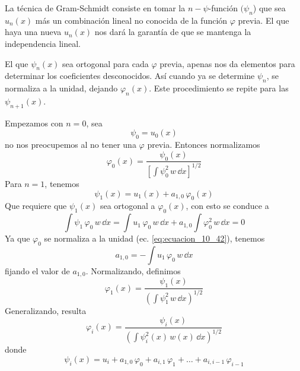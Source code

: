 La técnica de Gram-Schmidt consiste en tomar la $n-\psi$-función $(\psi_{n}$) que sea $u_{n}(x)$ más un combinación lineal no conocida de la función $\varphi$ previa. El que haya una nueva $u_{n}(x)$ nos dará la garantía de que se mantenga la independencia lineal.

El que $\psi_{n}(x)$ sea ortogonal para cada $\varphi$ previa, apenas nos da elementos para determinar los coeficientes desconocidos. Así cuando ya se determine $\psi_{n}$, se normaliza a la unidad, dejando $\varphi_{n}(x)$. Este procedimiento se repite para las $\psi_{n+1}(x)$.

Empezamos con $n=0$, sea
\begin{equation}
\psi_{0} = u_{0}(x)
\label{eq:ecuacion_10_41}
\end{equation}
no nos preocupemos al no tener una $\varphi$ previa. Entonces normalizamos
\begin{equation}
\varphi_{0}(x) = \dfrac{\psi_{0}(x)}{\left[ \int \psi_{0}^{2} \, w \, \dd x \right]^{1/2}}
\label{eq:ecuacion_10_42}
\end{equation}
Para $n=1$, tenemos
\begin{equation}
\psi_{1}(x) = u_{1}(x) + a_{1,0} \, \varphi_{0}(x)
\label{eq:ecuacion_10_43}
\end{equation}
Que requiere que $\psi_{1}(x)$ sea ortogonal a $\varphi_{0}(x)$, con esto se conduce a
\begin{equation}
\int \psi_{1} \, \varphi_{0} \, w \, \dd x = \int u_{1} \, \varphi_{0} \, w \, \dd x + a_{1,0} \int \varphi_{0}^{2} \, w \,  \dd x = 0
\label{eq:ecuacion_10_44}
\end{equation}
Ya que $\varphi_{0}$ se normaliza a la unidad (ec. \ref{eq:ecuacion_10_42}), tenemos
\begin{equation}
a_{1,0} = - \int	u_{1} \, \varphi_{0} \, w \, \dd x
\label{eq:ecuacion_10_45}
\end{equation}
fijando el valor de $a_{1, 0}$. Normalizando, definimos
\begin{equation}
\varphi_{1} (x) = \dfrac{\psi_{1}(x)}{\left( \int \psi_{1}^{2} \, w \, \dd x \right)^{1/2}}
\label{eq:ecuacion_10_46}
\end{equation}
Generalizando, resulta
\begin{equation}
\varphi_{i}(x) = \dfrac{\psi_{i}(x)}{\left( \int \psi_{i}^{2}(x) \, w(x) \, \dd x \right)^{1/2}}
\label{eq:ecuacion_10_47}
\end{equation}
donde
\begin{equation}
\psi_{i}(x) = u_{i} + a_{1,0} \, \varphi_{0} + a_{i,1} \, \varphi_{1} + \ldots + a_{i,i-1} \, \varphi_{i-1}
\label{eq:ecuacion_10_48}
\end{equation}
